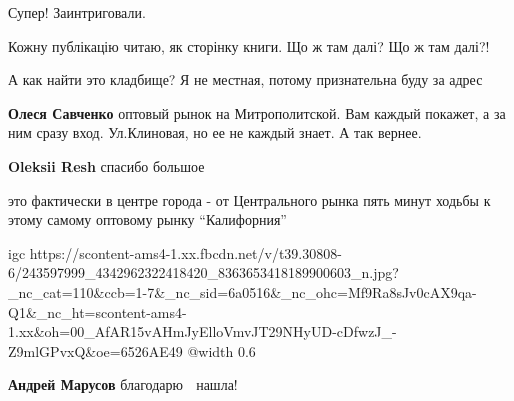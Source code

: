  
 
 
 
 

\qqSecCmt


Супер! Заинтриговали.


Кожну публікацію читаю, як сторінку книги. Що ж там далі? Що ж там далі?!


А как найти это кладбище? Я не местная, потому признательна буду за адрес

\begin{itemize} %
\textbf{Олеся Савченко} оптовый рынок на Митрополитской. Вам каждый покажет, а за ним сразу вход. Ул.Клиновая, но ее не каждый знает. А так вернее.

\textbf{Oleksii Resh} спасибо большое 🙏

\end{itemize} %


это фактически в центре города - от Центрального рынка пять минут ходьбы к
этому самому оптовому рынку \enquote{Калифорния} 

\ifcmt
  igc https://scontent-ams4-1.xx.fbcdn.net/v/t39.30808-6/243597999_4342962322418420_8363653418189900603_n.jpg?_nc_cat=110&ccb=1-7&_nc_sid=6a0516&_nc_ohc=Mf9Ra8sJv0cAX9qa-Q1&_nc_ht=scontent-ams4-1.xx&oh=00_AfAR15vAHmJyElloVmvJT29NHyUD-cDfwzJ_-Z9mlGPvxQ&oe=6526AE49
	@width 0.6
\fi

\begin{itemize} %
\textbf{Андрей Марусов} благодарю 🙏 нашла! 
\end{itemize} %
